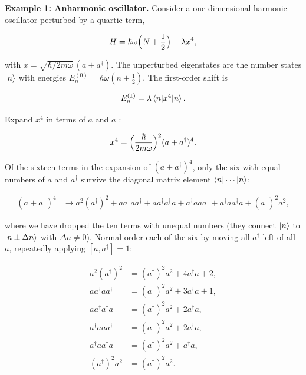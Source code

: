 \medskip\noindent\textbf{Example 1: Anharmonic oscillator.}
Consider a one-dimensional harmonic oscillator perturbed by a quartic term,
\begin{linenomath}
\begin{equation*}
H = \hbar\omega\Bigl(N + \frac{1}{2}\Bigr) + \lambda x^{4},
\end{equation*}
\end{linenomath}
with $x = \sqrt{\hbar/2m\omega}\,(a + a^{\dagger})$. The unperturbed eigenstates are the number states $\ket{n}$ with energies $E_{n}^{(0)} = \hbar\omega(n + \tfrac12)$. The first-order shift is
\begin{linenomath}
\begin{equation*}
E_{n}^{(1)} = \lambda\braket{n|x^{4}|n}.
\end{equation*}
\end{linenomath}
Expand $x^{4}$ in terms of $a$ and $a^{\dagger}$:
\begin{linenomath}
\begin{equation*}
x^{4} = \Bigl(\frac{\hbar}{2m\omega}\Bigr)^{2}(a + a^{\dagger})^{4}.
\end{equation*}
\end{linenomath}
Of the sixteen terms in the expansion of $(a+a^{\dagger})^{4}$, only the six with equal numbers of $a$ and $a^{\dagger}$ survive the diagonal matrix element $\braket{n|\cdots|n}$:
\begin{linenomath}
\begin{align*}
(a+a^{\dagger})^{4} &\to
a^{2}(a^{\dagger})^{2} + a a^{\dagger} a a^{\dagger} + a a^{\dagger} a^{\dagger} a
+ a^{\dagger}a a a^{\dagger} + a^{\dagger}a a^{\dagger}a + (a^{\dagger})^{2}a^{2},
\end{align*}
\end{linenomath}
where we have dropped the ten terms with unequal numbers (they connect $\ket{n}$ to $\ket{n\pm\Delta n}$ with $\Delta n\neq 0$). Normal-order each of the six by moving all $a^{\dagger}$ left of all $a$, repeatedly applying $[a,a^{\dagger}]=1$:
\begin{linenomath}
\begin{align*}
a^{2}(a^{\dagger})^{2} &= (a^{\dagger})^{2}a^{2} + 4a^{\dagger}a + 2, \\
a a^{\dagger} a a^{\dagger} &= (a^{\dagger})^{2}a^{2} + 3a^{\dagger}a + 1, \\
a a^{\dagger} a^{\dagger} a &= (a^{\dagger})^{2}a^{2} + 2a^{\dagger}a, \\
a^{\dagger}a a a^{\dagger} &= (a^{\dagger})^{2}a^{2} + 2a^{\dagger}a, \\
a^{\dagger}a a^{\dagger}a &= (a^{\dagger})^{2}a^{2} + a^{\dagger}a, \\
(a^{\dagger})^{2}a^{2} &= (a^{\dagger})^{2}a^{2}.
\end{align*}
\end{linenomath}
